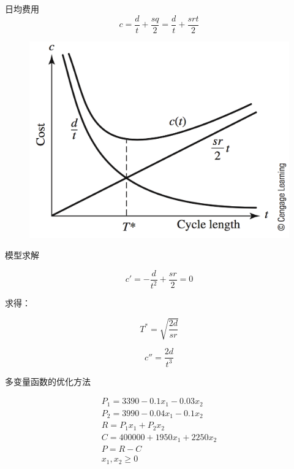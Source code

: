 \documentclass[mathserif, table]{beamer}
\begin{document}
\begin{frame}{日均费用}
  \[
    c = \frac{d}{t} + \frac{s q}{2} = \frac{d}{t} + \frac{s r t}{2}
  \]

  \begin{figure}
    \centering
    \includegraphics[width=.6\textwidth{}]{13_4.png}
  \end{figure}
\end{frame}

\begin{frame}{模型求解}

  \[
    c' = -\frac{d}{t^2} + \frac{s r}{2} = 0
  \]

  求得：

  \[
    T^\ast = \sqrt{ \frac{2 d}{s r} }
  \]

  \[
    c'' = \frac{2 d}{t^3}
  \]
  
\end{frame}

\begin{frame}{多变量函数的优化方法}

  \begin{gather*}
    P_1 = 3390 - 0.1 x_1 - 0.03 x_2\\
    P_2 = 3990 - 0.04 x_1 - 0.1 x_2\\
    R = P_1 x_1 + P_2 x_2\\
    C = 400000 + 1950 x_1 + 2250 x_2\\
    P = R - C\\
    x_1, x_2 \ge 0
  \end{gather*}
  
  
\end{frame}
\end{document}
